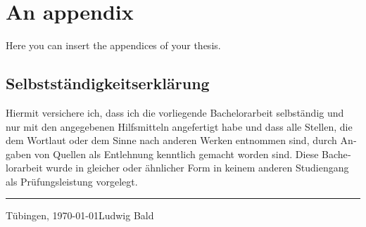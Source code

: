 \documentclass[twoside,12pt,a4paper]{report}
\begin{document}
\chapter{An appendix}
Here you can insert the appendices of your thesis.




\begin{otherlanguage}{ngerman}
	\chapter*{Selbstst\"andigkeitserkl\"arung}
	
	Hiermit versichere ich, dass ich die vorliegende Bachelorarbeit selbst\"andig und
	nur mit den angegebenen Hilfsmitteln angefertigt habe und dass alle Stellen,
	die dem Wortlaut oder dem Sinne nach anderen Werken entnommen sind,
	durch Angaben von Quellen als Entlehnung kenntlich gemacht worden sind.
	Diese Bachelorarbeit wurde in gleicher oder \"ahnlicher Form in keinem anderen
	Studiengang als Pr\"ufungsleistung vorgelegt.
	
	\vspace*{8ex}
	\hrule
	\vspace*{2ex}
	\noindent
	Tübingen, \today \hfill Ludwig Bald
\end{otherlanguage}
\end{document}
